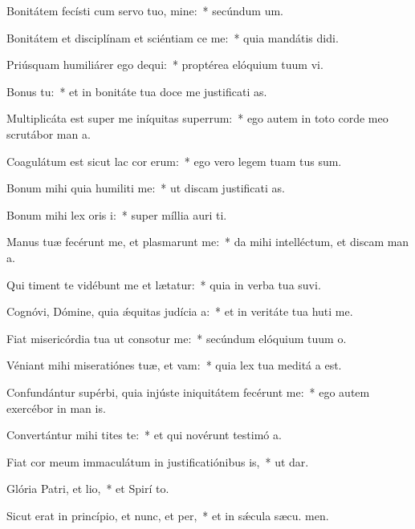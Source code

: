 \item Bonitátem fecísti cum servo tuo, mine:~* secúndum  um.
\item Bonitátem et disciplínam et sciéntiam ce me:~* quia mandátis  didi.
\item Priúsquam humiliárer ego dequi:~* proptérea elóquium tuum vi.
\item Bonus  tu:~* et in bonitáte tua doce me justificati as.
\item Multiplicáta est super me iníquitas superrum:~* ego autem in toto corde meo scrutábor man a.
\item Coagulátum est sicut lac cor erum:~* ego vero legem tuam tus sum.
\item Bonum mihi quia humiliti me:~* ut discam justificati as.
\item Bonum mihi lex oris i:~* super míllia auri  ti.
\item Manus tuæ fecérunt me, et plasmarunt me:~* da mihi intelléctum, et discam man a.
\item Qui timent te vidébunt me et lætatur:~* quia in verba tua suvi.
\item Cognóvi, Dómine, quia ǽquitas judícia a:~* et in veritáte tua huti me.
\item Fiat misericórdia tua ut consotur me:~* secúndum elóquium tuum  o.
\item Véniant mihi miseratiónes tuæ, et vam:~* quia lex tua meditá a est.
\item Confundántur supérbi, quia injúste iniquitátem fecérunt  me:~* ego autem exercébor in man is.
\item Convertántur mihi tites te:~* et qui novérunt testimó a.
\item Fiat cor meum immaculátum in justificatiónibus is,~* ut  dar.
\item Glória Patri, et lio,~* et Spirí to.
\item Sicut erat in princípio, et nunc, et per,~* et in sǽcula sæcu. men.
